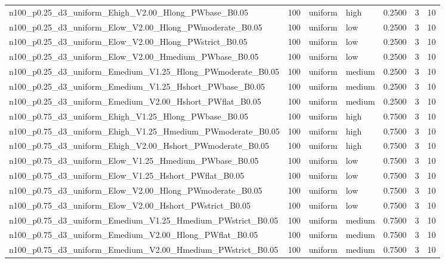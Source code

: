 \begin{tabular}{lrllrrr}
n100_p0.25_d3_uniform_Ehigh_V2.00_Hlong_PWbase_B0.05 & 100 & uniform & high & 0.2500 & 3 & 10 \\
n100_p0.25_d3_uniform_Elow_V2.00_Hlong_PWmoderate_B0.05 & 100 & uniform & low & 0.2500 & 3 & 10 \\
n100_p0.25_d3_uniform_Elow_V2.00_Hlong_PWstrict_B0.05 & 100 & uniform & low & 0.2500 & 3 & 10 \\
n100_p0.25_d3_uniform_Elow_V2.00_Hmedium_PWbase_B0.05 & 100 & uniform & low & 0.2500 & 3 & 10 \\
n100_p0.25_d3_uniform_Emedium_V1.25_Hlong_PWmoderate_B0.05 & 100 & uniform & medium & 0.2500 & 3 & 10 \\
n100_p0.25_d3_uniform_Emedium_V1.25_Hshort_PWbase_B0.05 & 100 & uniform & medium & 0.2500 & 3 & 10 \\
n100_p0.25_d3_uniform_Emedium_V2.00_Hshort_PWflat_B0.05 & 100 & uniform & medium & 0.2500 & 3 & 10 \\
n100_p0.75_d3_uniform_Ehigh_V1.25_Hlong_PWbase_B0.05 & 100 & uniform & high & 0.7500 & 3 & 10 \\
n100_p0.75_d3_uniform_Ehigh_V1.25_Hmedium_PWmoderate_B0.05 & 100 & uniform & high & 0.7500 & 3 & 10 \\
n100_p0.75_d3_uniform_Ehigh_V2.00_Hshort_PWmoderate_B0.05 & 100 & uniform & high & 0.7500 & 3 & 10 \\
n100_p0.75_d3_uniform_Elow_V1.25_Hmedium_PWbase_B0.05 & 100 & uniform & low & 0.7500 & 3 & 10 \\
n100_p0.75_d3_uniform_Elow_V1.25_Hshort_PWflat_B0.05 & 100 & uniform & low & 0.7500 & 3 & 10 \\
n100_p0.75_d3_uniform_Elow_V2.00_Hlong_PWmoderate_B0.05 & 100 & uniform & low & 0.7500 & 3 & 10 \\
n100_p0.75_d3_uniform_Elow_V2.00_Hshort_PWstrict_B0.05 & 100 & uniform & low & 0.7500 & 3 & 10 \\
n100_p0.75_d3_uniform_Emedium_V1.25_Hmedium_PWstrict_B0.05 & 100 & uniform & medium & 0.7500 & 3 & 10 \\
n100_p0.75_d3_uniform_Emedium_V2.00_Hlong_PWflat_B0.05 & 100 & uniform & medium & 0.7500 & 3 & 10 \\
n100_p0.75_d3_uniform_Emedium_V2.00_Hmedium_PWstrict_B0.05 & 100 & uniform & medium & 0.7500 & 3 & 10 \\
\bottomrule
\end{tabular}
